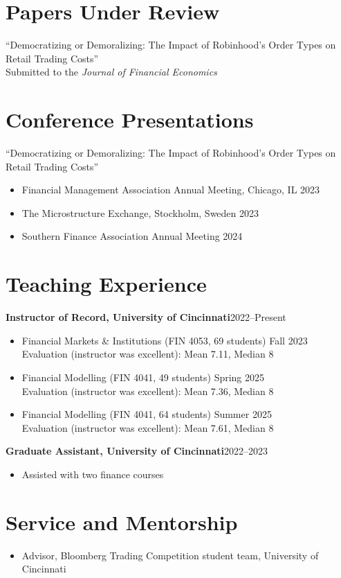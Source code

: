 \documentclass[11pt]{article}
\newcommand{\entry}[2]{\noindent\textbf{#1}\hfill #2\par}
\begin{document}
\section{Papers Under Review}
``Democratizing or Demoralizing: The Impact of Robinhood's Order Types on Retail Trading Costs''\\
\hspace*{1.4em}Submitted to the \textit{Journal of Financial Economics}

\section{Conference Presentations}
``Democratizing or Demoralizing: The Impact of Robinhood's Order Types on Retail Trading Costs''
\begin{itemize}
  \item Financial Management Association Annual Meeting, Chicago, IL \hfill 2023
  \item The Microstructure Exchange, Stockholm, Sweden \hfill 2023
  \item Southern Finance Association Annual Meeting \hfill 2024
\end{itemize}

\section{Teaching Experience}
\entry{Instructor of Record, University of Cincinnati}{2022--Present}
\begin{itemize}
  \item Financial Markets \& Institutions (FIN 4053, 69 students) \hfill Fall 2023\\
        Evaluation (instructor was excellent): Mean 7.11, Median 8
  \item Financial Modelling (FIN 4041, 49 students) \hfill Spring 2025\\
        Evaluation (instructor was excellent): Mean 7.36, Median 8
  \item Financial Modelling (FIN 4041, 64 students) \hfill Summer 2025\\
        Evaluation (instructor was excellent): Mean 7.61, Median 8
\end{itemize}
\entry{Graduate Assistant, University of Cincinnati}{2022--2023}
\begin{itemize}
  \item Assisted with two finance courses
\end{itemize}

\section{Service and Mentorship}
\begin{itemize}
  \item Advisor, Bloomberg Trading Competition student team, University of Cincinnati
\end{itemize}
\end{document}
